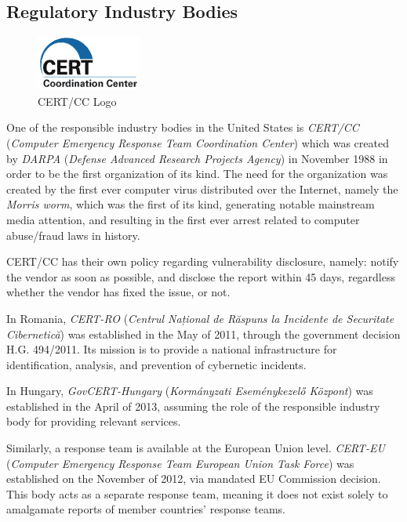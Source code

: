 \documentclass[a4paper,12pt]{article}
\begin{document}
\subsection{Regulatory Industry Bodies}
 
	
	\begin{figure}
		\vspace{-10pt}
		\centering
		\includegraphics[scale=0.75]{cert.png}
		\caption{CERT/CC Logo}
	\end{figure}
	
	One of the responsible industry bodies in the United States is \textit{CERT/CC} (\textit{Computer Emergency Response Team Coordination Center}) which was created by \textit{DARPA} (\textit{Defense Advanced Research Projects Agency}) in November 1988 in order to be the first organization of its kind. The need for the organization was created by the first ever computer virus distributed over the Internet, namely the \textit{Morris worm}\cite{cert15}, which was the first of its kind, generating notable mainstream media attention, and resulting in the first ever arrest related to computer abuse/fraud laws in history.
	
	CERT/CC has their own policy regarding vulnerability disclosure, namely: notify the vendor as soon as possible, and disclose the report within 45 days, regardless whether the vendor has fixed the issue, or not.
	
	In Romania, \textit{CERT-RO} (\textit{Centrul Național de Răspuns la Incidente de Securitate Cibernetică}) was established in the May of 2011, through the government decision H.G. 494/2011\cite{certro12}. Its mission is to provide a national infrastructure for identification, analysis, and prevention of cybernetic incidents.
	
	In Hungary, \textit{GovCERT-Hungary} (\textit{Kormányzati Eseménykezelő Központ}) was established in the April of 2013\cite{certhu13}, assuming the role of the responsible industry body for providing relevant services.
	
	Similarly, a response team is available at the European Union level. \textit{CERT-EU} (\textit{Computer Emergency Response Team European Union Task Force}) was established on the November of 2012\cite{certeu13}, via mandated EU Commission decision. This body acts as a separate response team, meaning it does not exist solely to amalgamate reports of member countries' response teams.
	
\end{document}

